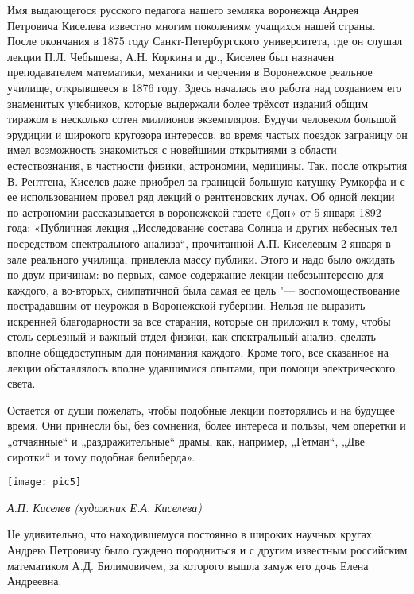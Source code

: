 Имя выдающегося русского педагога нашего земляка воронежца Андрея Петровича Киселева известно многим поколениям учащихся нашей страны. После окончания в 1875 году Санкт-Петербургского университета, где он слушал лекции П.Л. Чебышева, А.Н. Коркина и др., Киселев был назначен преподавателем математики, механики и черчения в Воронежское реальное училище, открывшееся в 1876 году. Здесь началась его работа над созданием его знаменитых учебников, которые выдержали более трёхсот изданий общим тиражом в несколько сотен миллионов экземпляров. Будучи человеком большой эрудиции и широкого кругозора интересов, во время частых поездок заграницу он имел возможность знакомиться с новейшими открытиями в области естествознания, в частности физики, астрономии, медицины. Так, после открытия В. Рентгена, Киселев даже приобрел за границей большую катушку Румкорфа и с ее использованием провел ряд лекций о рентгеновских лучах. Об одной лекции по астрономии рассказывается в воронежской газете «Дон» от 5 января 1892 года: «Публичная лекция „Исследование состава Солнца и других небесных тел посредством спектрального анализа“, прочитанной А.П. Киселевым 2 января в зале реального училища, привлекла массу публики. Этого и надо было ожидать по двум причинам: во-первых, самое содержание лекции небезынтересно для каждого, а во-вторых, симпатичной была самая ее цель "--- воспомоществование пострадавшим от неурожая в Воронежской губернии. Нельзя не выразить искренней благодарности за все старания, которые он приложил к тому, чтобы столь серьезный и важный отдел физики, как спектральный анализ, сделать вполне общедоступным для понимания каждого. Кроме того, все сказанное на лекции обставлялось вполне удавшимися опытами, при помощи электрического света.

 Остается от души пожелать, чтобы подобные лекции повторялись и на будущее время. Они принесли бы, без сомнения, более интереса и пользы, чем оперетки и „отчаянные“ и „раздражительные“ драмы, как, например, „Гетман“, „Две сиротки“ и тому подобная белиберда».

\begin{center}
\texttt{[image: pic5]}

{\it А.П. Киселев (художник Е.А. Киселева)}
\end{center}


Не удивительно, что находившемуся постоянно в широких научных кругах Андрею Петровичу было суждено породниться и с другим известным российским математиком А.Д. Билимовичем, за которого вышла замуж его дочь Елена Андреевна.

